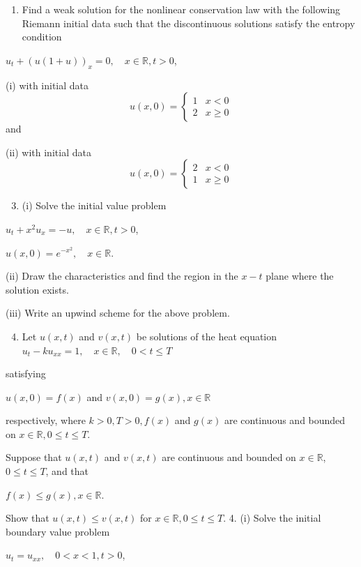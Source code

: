\documentclass[10pt]{article}
\begin{document}
\begin{enumerate}
  \item Find a weak solution for the nonlinear conservation law with the following Riemann initial data such that the discontinuous solutions satisfy the entropy condition
\end{enumerate}
$u_{t}+(u(1+u))_{x}=0, \quad x \in \mathbb{R}, t>0$,

(i) with initial data
$$
u(x, 0)= \begin{cases}1 & x<0 \\ 2 & x \geq 0\end{cases}
$$
and

(ii) with initial data
$$
u(x, 0)= \begin{cases}2 & x<0 \\ 1 & x \geq 0\end{cases}
$$

\begin{enumerate}
  \setcounter{enumi}{2}
  \item (i) Solve the initial value problem
\end{enumerate}
$u_{t}+x^{2} u_{x}=-u, \quad x \in \mathbb{R}, t>0$,

$u(x, 0)=e^{-x^{2}}, \quad x \in \mathbb{R}$.

(ii) Draw the characteristics and find the region in the $x-t$ plane where the solution exists.

(iii) Write an upwind scheme for the above problem.

\begin{enumerate}
  \setcounter{enumi}{3}
  \item Let $u(x, t)$ and $v(x, t)$ be solutions of the heat equation $u_{t}-k u_{x x}=1, \quad x \in \mathbb{R}, \quad 0<t \leq T$
\end{enumerate}
satisfying

$u(x, 0)=f(x)$ and $v(x, 0)=g(x), x \in \mathbb{R}$

respectively, where $k>0, T>0, f(x)$ and $g(x)$ are continuous and bounded on $x \in \mathbb{R}, 0 \leq t \leq T$.

Suppose that $u(x, t)$ and $v(x, t)$ are continuous and bounded on $x \in \mathbb{R}$, $0 \leq t \leq T$, and that

$f(x) \leq g(x), x \in \mathbb{R} .$

Show that $u(x, t) \leq v(x, t)$ for $x \in \mathbb{R}, 0 \leq t \leq T$. 4. (i) Solve the initial boundary value problem

$u_{t}=u_{x x}, \quad 0<x<1, t>0$,
\end{document}

